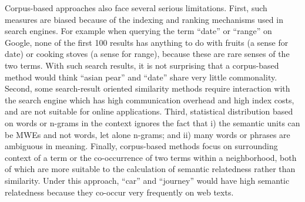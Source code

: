Corpus-based approaches also face several serious limitations.
First, such measures are biased because of the indexing and 
ranking mechanisms used in search engines. 
For example when querying the term ``date''
or ``range''
on Google, none of the first 100 results has anything to do with
fruits (a sense for date) or cooking stoves (a sense for range),
because these are rare senses of the two terms.
With such search results, it is not surprising that a corpus-based
method would think ``asian pear'' and ``date'' share very little commonality.
Second, some search-result oriented similarity methods require
interaction with the search engine which has high communication overhead
and high index costs, and are not suitable for online applications.
Third, statistical distribution based on words or n-grams in the
context ignores the fact that i) the semantic units can be MWEs and not
words, let alone n-grams; and ii) many words or phrases are ambiguous
in meaning. %
Finally, corpus-based methods focus on
surrounding context of a term or the co-occurrence of two terms within
a neighborhood, both of which are more suitable to the calculation of
semantic relatedness rather than similarity.  Under this approach,
``car'' and ``journey'' would have high semantic relatedness because
they co-occur very frequently on web texts.

